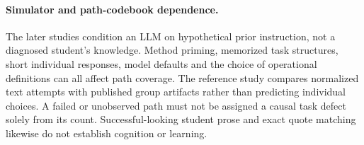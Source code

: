 \paragraph{Simulator and path-codebook dependence.} The later studies condition an LLM on hypothetical prior instruction, not a diagnosed student's knowledge. Method priming, memorized task structures, short individual responses, model defaults and the choice of operational definitions can all affect path coverage. The reference study compares normalized text attempts with published group artifacts rather than predicting individual choices. A failed or unobserved path must not be assigned a causal task defect solely from its count. Successful-looking student prose and exact quote matching likewise do not establish cognition or learning.
